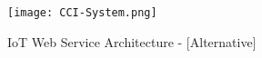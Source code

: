 \begin{figure}[!h]
    \centering
    \texttt{[image: CCI-System.png]}
    \caption{IoT Web Service Architecture - [Alternative]}\label{fig::arch}
\end{figure}